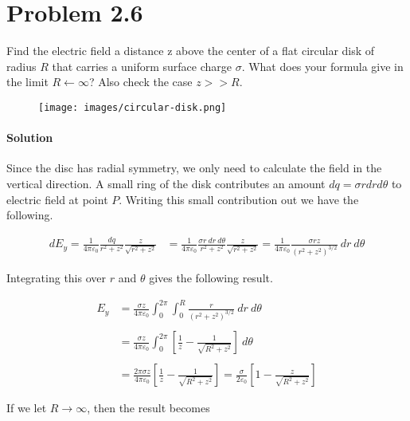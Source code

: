 \documentclass{article}
\begin{document}
\newpage

\section*{Problem 2.6}

Find the electric field a distance z above the center of a flat circular disk of radius $R$ that carries a uniform surface charge $\sigma$. What does your formula give in the limit $R \leftarrow \infty$? Also check the case $z >> R$.

\begin{figure}[h]
    \centering
    \texttt{[image: images/circular-disk.png]}
\end{figure}

\paragraph{Solution} Since the disc has radial symmetry, we only need to calculate the field in the vertical direction.  A small ring of the disk contributes an amount $dq = \sigma r dr d\theta$ to electric field at point $P$. Writing this small contribution out we have the following.

\begin{align*}
dE_y = \frac{1}{4\pi\varepsilon_0}\frac{dq}{r^2 + z^2}\frac{z}{\sqrt{r^2 + z^2}} &= 
\frac{1}{4\pi\varepsilon_0}\frac{\sigma r \ dr \ d\theta}{r^2 + z^2}\frac{z}{\sqrt{r^2 + z^2}} = \frac{1}{4\pi\varepsilon_0}\frac{\sigma rz}{(r^2 + z^2)^{3/2}} \ dr \ d\theta
\end{align*}

Integrating this over $r$ and $\theta$ gives the following result.

\begin{align*}
    E_y &= \frac{\sigma z}{4\pi\varepsilon_0} \int_0^{2\pi} \int_0^R \frac{r}{(r^2 + z^2)^{3/2}} \ dr \ d\theta \\
    \\
    &= \frac{\sigma z}{4\pi\varepsilon_0} \int_0^{2\pi} \left[ \frac{1}{z} - \frac{1}{\sqrt{R^2 + z^2}}\right] \ d\theta \\
    \\
    &= \frac{2\pi\sigma z}{4\pi\varepsilon_0}\left[ \frac{1}{z} - \frac{1}{\sqrt{R^2 + z^2}}\right] = \frac{\sigma}{2\varepsilon_0}\left[ 1 - \frac{z}{\sqrt{R^2 + z^2}}\right]
\end{align*}

If we let $R \rightarrow \infty$, then the result becomes
\end{document}
